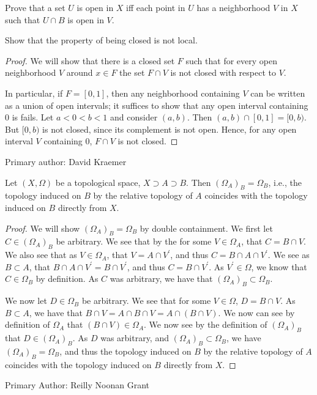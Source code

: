 \begin{minorEx}%
Prove that a set $U$ is open in $X$ iff each point in $U$ has a neighborhood $V$ in $X$ such that $U \cap B$ is open in $V$.
\end{minorEx}

\begin{minorEx}%
Show that the property of being closed is not local.
\end{minorEx}

\begin{proof}
    We will show that there is a closed set $F$ such that for every open
    neighborhood $V$ around $x \in F$ the set $F \cap V$ is not closed with
    respect to $V$.

    In particular, if $F=[0,1]$, then any neighborhood containing $V$ can be
    written as a union of open intervals; it suffices to show that any open
    interval containing $0$ is fails. Let $a < 0 < b < 1$ and consider $(a,b)$.
    Then $(a,b) \cap [0, 1] = [0, b)$. But $[0, b)$ is not closed, since its
        complement is not open. Hence, for any open interval $V$ containing 0,
        $F \cap V$ is not closed.
\end{proof}

Primary author: David Kraemer

\begin{majorEx}%
Let $(X, \Omega)$ be a topological space, $X \supset A \supset B$. Then $(\Omega_A)_B=\Omega_B$, i.e., the topology induced on $B$ by the relative topology of $A$ coincides with the topology induced on $B$ directly from $X$.
\end{majorEx}


\begin{proof}
  We will show $(\Omega_A)_B=\Omega_B$ by double containment. We first
  let $C \in (\Omega_A)_B$ be arbitrary. We see that by the for some
  $V \in \Omega_A$, that $C = B \cap V$. We also see that as $V \in
  \Omega_A$, that $V = A \cap  V^\prime$, and thus $C = B \cap A \cap
  V^\prime$. We see as $B\subset A$, that 
  $B \cap A \cap V^\prime=B \cap V^\prime$, and thus $C =B \cap
  V^\prime$. As $V^\prime \in \Omega$, we know that $C \in \Omega_B$
  by definition. As $C$ was arbitrary, we have that 
  $(\Omega_A)_B \subset \Omega_B$.

  We now let $D \in \Omega_B$ be arbitrary. We see that for some $V
  \in \Omega$, $D = B \cap V$. As $B\subset A$, we have that $B \cap V
  = A\cap B \cap V=A\cap (B \cap V)$. We now can see by definition of
  $\Omega_A$ that $(B \cap V) \in \Omega_A$. We now see by the
  definition of $(\Omega_A)_B$ that $D\in (\Omega_A)_B$. As $D$ was
  arbitrary, and $(\Omega_A)_B \subset \Omega_B$, we have 
  $(\Omega_A)_B = \Omega_B$, and thus the topology induced on $B$ by
  the relative topology of $A$ coincides with the topology induced on
  $B$ directly from $X$.  
\end{proof}
Primary Author: Reilly Noonan Grant

